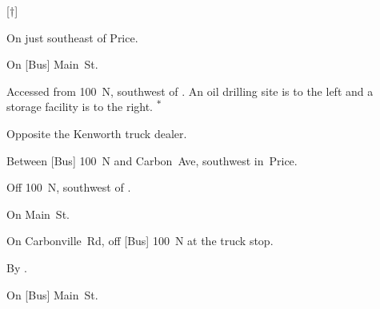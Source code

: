 
[$\dagger$]

\begin{LocationList}

On   just southeast of Price.

On [Bus]  Main~St.

Accessed from 100~N, southwest of  .
An oil drilling site is to the left and a storage facility is to the right.%
\textsuperscript{\scriptsize $\ast$}

\Location{\GarageHQ \Garage}
Opposite the Kenworth truck dealer.

Between [Bus]  100~N and  Carbon~Ave, southwest in~Price.

Off 100~N, southwest of  .

\Location{\RecruitmentAgency \Recruitment}
On Main~St.

On Carbonville~Rd, off [Bus]  100~N at the truck stop.

\Location{\TruckStop \Gas \Rest}
By   .

On [Bus]  Main~St.

\end{LocationList}
